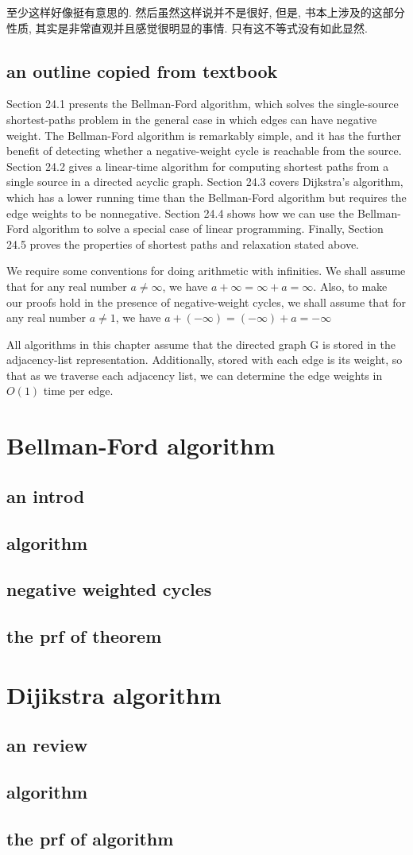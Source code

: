\documentclass[a4paper, 10pt]{ctexart} %
\begin{document}
至少这样好像挺有意思的. 然后虽然这样说并不是很好, 但是, 书本上涉及的这部分性质, 其实是非常直观并且感觉很明显的事情. 
只有这不等式没有如此显然. 
\subsection{an outline copied from textbook}
Section 24.1 presents the Bellman-Ford algorithm, which solves the single-source
shortest-paths problem in the general case in which edges can have negative weight.
The Bellman-Ford algorithm is remarkably simple, and it has the further benefit
of detecting whether a negative-weight cycle is reachable from the source. 
Section 24.2 gives a linear-time algorithm for computing shortest paths from a single
source in a directed acyclic graph. Section 24.3 covers Dijkstra's algorithm, which
has a lower running time than the Bellman-Ford algorithm but requires the edge
weights to be nonnegative. Section 24.4 shows how we can use the Bellman-Ford
algorithm to solve a special case of linear programming. Finally, Section 24.5
proves the properties of shortest paths and relaxation stated above.

We require some conventions for doing arithmetic with infinities. We shall assume
that for any real number $a \ne \infty$, we have $a + \infty  = \infty + a = \infty$. Also, to
make our proofs hold in the presence of negative-weight cycles, we shall assume
that for any real number $a \ne 1$, we have $a + \left(- \infty\right) = \left(  - \infty\right) + a =  - \infty$

All algorithms in this chapter assume that the directed graph G is stored in the
adjacency-list representation. Additionally, stored with each edge is its weight, so
that as we traverse each adjacency list, we can determine the edge weights in $O \left(1\right)$ 
time per edge.
\section{Bellman-Ford algorithm}
\subsection{an introd}
\subsection{algorithm}
\subsection{negative weighted cycles}
\subsection{the prf of theorem}
\section{Dijikstra algorithm}
\subsection{an review}
\subsection{algorithm}
\subsection{the prf of algorithm}
\end{document}
